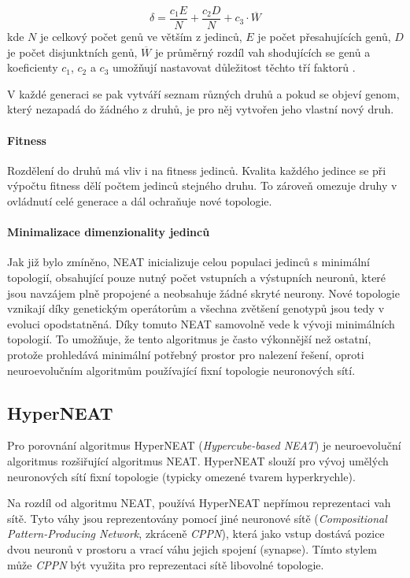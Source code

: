 \begin{equation}
    \delta = \frac{c_1E}{N} + \frac{c_2D}{N} + c_3\cdot\overline{W}
\end{equation}
kde $N$ je celkový počet genů ve větším z jedinců, $E$ je počet přesahujících
genů, $D$ je počet disjunktních genů, $\overline{W}$ je průměrný rozdíl vah
shodujících se genů a koeficienty $c_1$, $c_2$ a $c_3$ umožňují nastavovat
důležitost těchto tří faktorů \citep{stanley2002evolving}.

V každé generaci se pak vytváří seznam
různých druhů a pokud se objeví genom, který nezapadá do žádného z druhů, je
pro něj vytvořen jeho vlastní nový druh.

\paragraph{Fitness}
Rozdělení do druhů má vliv i na fitness jedinců. Kvalita každého jedince se při
výpočtu fitness dělí počtem jedinců stejného druhu. To zároveň omezuje druhy v
ovládnutí celé generace a dál ochraňuje nové topologie.

\paragraph{Minimalizace dimenzionality jedinců}
Jak již bylo zmíněno, NEAT inicializuje celou populaci jedinců s minimální
topologií, obsahující pouze nutný počet vstupních a výstupních neuronů,
které jsou navzájem plně propojené a neobsahuje žádné skryté neurony. Nové
topologie vznikají díky genetickým operátorům a všechna zvětšení genotypů jsou
tedy v evoluci opodstatněná. Díky tomuto NEAT samovolně vede k vývoji
minimálních topologií. To umožňuje, že tento algoritmus je často výkonnější než
ostatní, protože prohledává minimální potřebný prostor pro nalezení řešení,
oproti neuroevolučním algoritmům používající fixní topologie neuronových sítí.

\subsection{HyperNEAT} \label{NN - HyperNEAT}
Pro porovnání algoritmus HyperNEAT (\emph{Hypercube-based NEAT})
\citep{stanley2009hypercube} \citep{eplex} je neuroevoluční algoritmus
rozšiřující algoritmus NEAT. HyperNEAT slouží pro vývoj umělých neuronových
sítí fixní topologie (typicky omezené tvarem hyperkrychle). 

Na rozdíl od algoritmu NEAT, používá HyperNEAT nepřímou
reprezentaci vah sítě. Tyto váhy jsou reprezentovány pomocí jiné neuronové
sítě (\emph{Compositional Pattern-Producing Network}, zkráceně \emph{CPPN}),
která jako vstup dostává pozice dvou neuronů v prostoru a vrací váhu jejich
spojení (synapse). Tímto stylem může \emph{CPPN} být využita pro reprezentaci
sítě libovolné topologie. 

